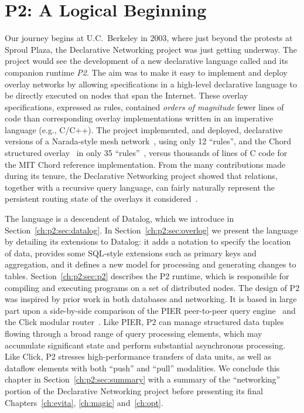 \chapter[P2: A Logical Beginning]{P2: A Logical Beginning}
\label{ch:p2}

Our journey begins at U.C.~Berkeley in $2003$, where just beyond the protests
at Sproul Plaza, the Declarative Networking project was just getting underway.
The project would see the development of a new declarative language called {\em
\OVERLOG} and its companion runtime {\em P2}.  The aim was to make it easy to
implement and deploy overlay networks by allowing specifications in a
high-level declarative language to be directly executed on nodes that span the
Internet.  These overlay specifications, expressed as \OVERLOG rules, contained
{\em orders of magnitude} fewer lines of code than corresponding overlay
implementations written in an imperative language (e.g., C/C++).  The project
implemented, and deployed, declarative versions of a Narada-style mesh
network~\cite{chu00case}, using only 12 ``rules'', and the Chord structured
overlay~\cite{chord} in only 35 ``rules''~\cite{p2:sosp}, versus thousands of
lines of C code for the MIT Chord reference implementation.  From the many
contributions made during its tenure, the Declarative Networking project showed
that relations, together with a recursive query language, can fairly naturally
represent the persistent routing state of the overlays it
considered~\cite{boon-thesis}.

The \OVERLOG language is a descendent of Datalog, which we introduce in
Section~\ref{ch:p2:sec:datalog}.  In Section~\ref{ch:p2:sec:overlog} we present
the \OVERLOG language by detailing its extensions to Datalog: it adds a
notation to specify the location of data, provides some SQL-style extensions
such as primary keys and aggregation, and it defines a new model for processing
and generating changes to tables.  Section~\ref{ch:p2:sec:p2} describes the P2
runtime, which is responsible for compiling and executing \OVERLOG programs on
a set of distributed nodes.  The design of P2 was inspired by prior work in
both databases and networking.  It is based in large part upon a side-by-side
comparison of the PIER peer-to-peer query engine~\cite{pier-cidr05} and the
Click modular router~\cite{click-tocs}.  Like PIER, P2 can manage structured
data tuples flowing through a broad range of query processing elements, which
may accumulate significant state and perform substantial asynchronous
processing.  Like Click, P2 stresses high-performance transfers of data units,
as well as dataflow elements with both ``push'' and ``pull'' modalities.  We
conclude this chapter in Section~\ref{ch:p2:sec:summary} with a summary of the
``networking'' portion of the Declarative Networking project before presenting
its final Chapters~\ref{ch:evita}, \ref{ch:magic} and~\ref{ch:opt}.

